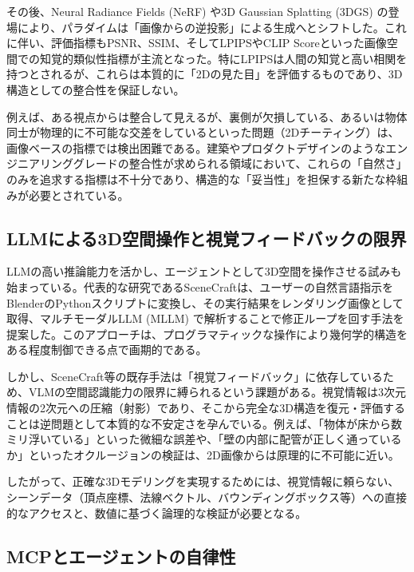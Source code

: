 \documentclass[dvipdfmx, a4paper, 9pt]{deimj}
\begin{document}
その後、Neural Radiance Fields (NeRF)\cite{mildenhall2020nerf} や3D Gaussian Splatting (3DGS)\cite{kerbl20233dgs} の登場により、パラダイムは「画像からの逆投影」による生成へとシフトした。これに伴い、評価指標もPSNR、SSIM、そしてLPIPS\cite{zhang2018lpips}やCLIP Score\cite{radford2021clip}といった画像空間での知覚的類似性指標が主流となった。特にLPIPSは人間の知覚と高い相関を持つとされるが、これらは本質的に「2Dの見た目」を評価するものであり、3D構造としての整合性を保証しない。

例えば、ある視点からは整合して見えるが、裏側が欠損している、あるいは物体同士が物理的に不可能な交差をしているといった問題（2Dチーティング）は、画像ベースの指標では検出困難である\cite{poole2022dreamfusion}。建築やプロダクトデザインのようなエンジニアリンググレードの整合性が求められる領域において、これらの「自然さ」のみを追求する指標は不十分であり、構造的な「妥当性」を担保する新たな枠組みが必要とされている。

\subsection{LLMによる3D空間操作と視覚フィードバックの限界}

LLMの高い推論能力を活かし、エージェントとして3D空間を操作させる試みも始まっている。代表的な研究であるSceneCraft\cite{hu2024scenecraft}は、ユーザーの自然言語指示をBlenderのPythonスクリプトに変換し、その実行結果をレンダリング画像として取得、マルチモーダルLLM (MLLM) で解析することで修正ループを回す手法を提案した。このアプローチは、プログラマティックな操作により幾何学的構造をある程度制御できる点で画期的である。

しかし、SceneCraft等の既存手法は「視覚フィードバック」に依存しているため、VLMの空間認識能力の限界に縛られるという課題がある。視覚情報は3次元情報の2次元への圧縮（射影）であり、そこから完全な3D構造を復元・評価することは逆問題として本質的な不安定さを孕んでいる。例えば、「物体が床から数ミリ浮いている」といった微細な誤差や、「壁の内部に配管が正しく通っているか」といったオクルージョンの検証は、2D画像からは原理的に不可能に近い。

したがって、正確な3Dモデリングを実現するためには、視覚情報に頼らない、シーンデータ（頂点座標、法線ベクトル、バウンディングボックス等）への直接的なアクセスと、数値に基づく論理的な検証が必要となる。

\subsection{MCPとエージェントの自律性}
\end{document}
